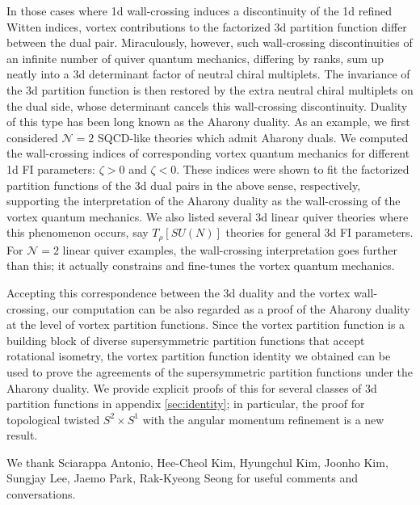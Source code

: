 \documentclass[a4paper,11pt]{article}
\begin{document}
In those cases where 1d wall-crossing induces a discontinuity of the 1d refined Witten indices,
vortex contributions to the factorized 3d partition function differ between the dual pair.
Miraculously, however, such wall-crossing discontinuities of an infinite number of quiver
quantum mechanics, differing by ranks, sum up neatly into a 3d determinant factor of neutral
chiral multiplets. The invariance of the 3d partition function is then restored by the
extra neutral chiral multiplets on the dual side, whose determinant cancels this wall-crossing
discontinuity. Duality of this type has been long known as the Aharony duality.
As an example, we first considered $\mathcal N = 2$ SQCD-like theories which admit Aharony duals. We computed the wall-crossing
indices of corresponding vortex quantum mechanics for different 1d FI parameters: $\zeta > 0$
and $\zeta < 0$. These indices were shown to fit the factorized partition functions of the
3d dual pairs in the above sense, respectively, supporting the interpretation of the Aharony
duality as the wall-crossing of the vortex quantum mechanics. We also listed several 3d
linear quiver theories where this phenomenon occurs, say $T_\rho [SU(N)]$ theories
for general 3d FI parameters. For $\mathcal N=2$ linear quiver examples, the wall-crossing
interpretation goes further than this; it actually constrains and fine-tunes the vortex
quantum mechanics.

Accepting this correspondence between the 3d duality and the vortex wall-crossing, our
computation can be also regarded as a proof of the Aharony duality at the level of vortex
partition functions. Since the vortex partition function is a building block of diverse
supersymmetric partition functions that accept rotational isometry, the vortex partition
function identity we obtained can be used to prove the agreements of the supersymmetric
partition functions under the Aharony duality. We provide explicit proofs of this
for several classes of 3d partition functions in appendix \ref{sec:identity}; in
particular, the proof for topological twisted $S^2 \times S^1$ with the angular momentum refinement is a new result.
\\








\acknowledgments

We thank Sciarappa Antonio, Hee-Cheol Kim, Hyungchul Kim, Joonho Kim, Sungjay Lee, Jaemo Park, Rak-Kyeong Seong for useful comments and conversations.
\\
\end{document}
